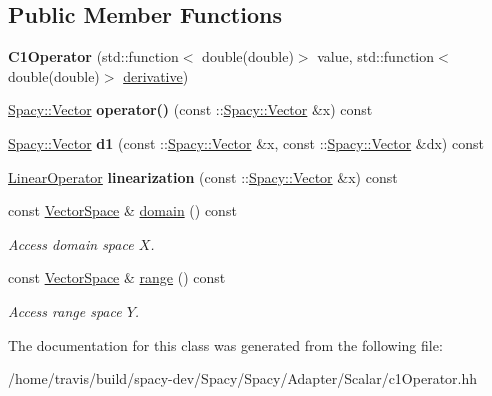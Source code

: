 \subsection*{\-Public \-Member \-Functions}
\begin{DoxyCompactItemize}
\item 
\hypertarget{classSpacy_1_1Scalar_1_1C1Operator_a97f719a6349064072c892972663e70c7}{{\bfseries \-C1\-Operator} (std\-::function$<$ double(double)$>$ value, std\-::function$<$ double(double)$>$ \hyperlink{namespaceSpacy_a002fe344fa6d04a6ac59a74ea25fddb6}{derivative})}\label{classSpacy_1_1Scalar_1_1C1Operator_a97f719a6349064072c892972663e70c7}

\item 
\hypertarget{classSpacy_1_1Scalar_1_1C1Operator_a9ab2d8a905a70dd848c984e532b50fed}{\hyperlink{classSpacy_1_1Vector}{\-Spacy\-::\-Vector} {\bfseries operator()} (const \-::\hyperlink{classSpacy_1_1Vector}{\-Spacy\-::\-Vector} \&x) const }\label{classSpacy_1_1Scalar_1_1C1Operator_a9ab2d8a905a70dd848c984e532b50fed}

\item 
\hypertarget{classSpacy_1_1Scalar_1_1C1Operator_a56908ac8a9cd1e959f15e3f71a00a01b}{\hyperlink{classSpacy_1_1Vector}{\-Spacy\-::\-Vector} {\bfseries d1} (const \-::\hyperlink{classSpacy_1_1Vector}{\-Spacy\-::\-Vector} \&x, const \-::\hyperlink{classSpacy_1_1Vector}{\-Spacy\-::\-Vector} \&dx) const }\label{classSpacy_1_1Scalar_1_1C1Operator_a56908ac8a9cd1e959f15e3f71a00a01b}

\item 
\hypertarget{classSpacy_1_1Scalar_1_1C1Operator_acefccd4cac61750dad6053a963b10944}{\hyperlink{structSpacy_1_1Scalar_1_1LinearOperator}{\-Linear\-Operator} {\bfseries linearization} (const \-::\hyperlink{classSpacy_1_1Vector}{\-Spacy\-::\-Vector} \&x) const }\label{classSpacy_1_1Scalar_1_1C1Operator_acefccd4cac61750dad6053a963b10944}

\item 
\hypertarget{classSpacy_1_1OperatorBase_a2588f9b3e0188820c4c494e63293dc6f}{const \hyperlink{classSpacy_1_1VectorSpace}{\-Vector\-Space} \& \hyperlink{classSpacy_1_1OperatorBase_a2588f9b3e0188820c4c494e63293dc6f}{domain} () const }\label{classSpacy_1_1OperatorBase_a2588f9b3e0188820c4c494e63293dc6f}

\begin{DoxyCompactList}\small\item\em \-Access domain space $X$. \end{DoxyCompactList}\item 
\hypertarget{classSpacy_1_1OperatorBase_ab19d3b7a6f290b1079248f1e567e53d6}{const \hyperlink{classSpacy_1_1VectorSpace}{\-Vector\-Space} \& \hyperlink{classSpacy_1_1OperatorBase_ab19d3b7a6f290b1079248f1e567e53d6}{range} () const }\label{classSpacy_1_1OperatorBase_ab19d3b7a6f290b1079248f1e567e53d6}

\begin{DoxyCompactList}\small\item\em \-Access range space $Y$. \end{DoxyCompactList}\end{DoxyCompactItemize}


\-The documentation for this class was generated from the following file\-:\begin{DoxyCompactItemize}
\item 
/home/travis/build/spacy-\/dev/\-Spacy/\-Spacy/\-Adapter/\-Scalar/c1\-Operator.\-hh\end{DoxyCompactItemize}
